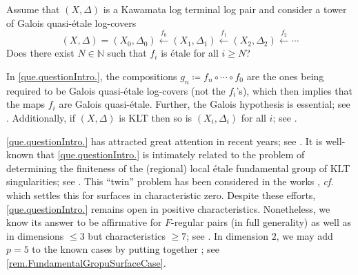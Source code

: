 \documentclass[12pt]{amsart}
\theoremstyle{plain}   %
\theoremstyle{definition}    %
\theoremstyle{remark}    %
\numberwithin{equation}{theorem}
\newcommand{\bN}{\mathbb{N}}
\newcommand{\cf}{{\itshape cf.} }
\begin{document}
\begin{question} \label{que.questionIntro.}
Assume that $(X,\Delta)$ is a Kawamata log terminal log pair and consider a tower of Galois quasi-\'etale log-covers
\begin{equation}\label{eqn.tower}
(X, \Delta) = (X_0, \Delta_0) \xleftarrow{f_0} (X_1, \Delta_1) \xleftarrow{f_1} (X_2, \Delta_2) \xleftarrow{f_2} \cdots
\end{equation} 
Does there exist $N \in \bN$ such that $f_i$ is \'etale for all $i\geq N$?
\end{question}
\begin{remark}
In \autoref{que.questionIntro.}, the compositions $g_n \coloneqq f_n \circ \cdots \circ f_0$ are the ones being required to be Galois quasi-\'etale log-covers (not the $f_i$'s), which then implies that the maps $f_i$ are Galois quasi-\'etale. Further, the Galois hypothesis is essential; see \cite[Proposition 11.4]{GrebKebekusPeternellEtaleFundamental}. Additionally, if $(X,\Delta)$ is KLT then so is $(X_i,\Delta_i)$ for all $i$; see \cite[Corollary 2.43]{KollarSingulaitieofMMP}.
\end{remark}


\autoref{que.questionIntro.} has attracted great attention in recent years; see \cite{GrebKebekusPeternellEtaleFundamental, XuFinitenessOfFundGroups, BhattCarvajalRojasGrafSchwedeTucker}. It is well-known that \autoref{que.questionIntro.} is intimately related to the problem of determining the finiteness of the (regional) local \'etale fundamental group of KLT singularities; see \cite{StibitzFundamentalGroups}. This ``twin'' problem has been considered in the works \cite{XuFinitenessOfFundGroups, CarvajalSchwedeTuckerEtaleFundFsignature,CarvajalRojasStablerKollarFundamentalGroupKLTthreefolds,BraunFundamentalGroupsKLT,BraunFilipazziMoragaSvaldiJordanProperty,CaiLeeTuckerSchwedePerfectoidSignature}, \cf \cite[Corollary 1.9]{KawamataTheConeOfCurves} which settles this for surfaces in characteristic zero. Despite these efforts, \autoref{que.questionIntro.} remains open in positive characteristics. Nonetheless, we know its answer to be affirmative for $F$-regular pairs (in full generality) as well as in dimensions $\leq 3$ but characteristics $\geq 7$; see \cite{BhattCarvajalRojasGrafSchwedeTucker,CarvajalRojasStablerKollarFundamentalGroupKLTthreefolds}. In dimension $2$, we may add $p=5$ to the known cases by putting together \cite{KawamataIndex1CoversOfLogTerminalSurfaceSingularities,ArtinCoveringsOfTheRtionalDoublePointsInCharacteristicp}; see \autoref{rem.FundamentalGropuSurfaceCase}. 
\end{document}
